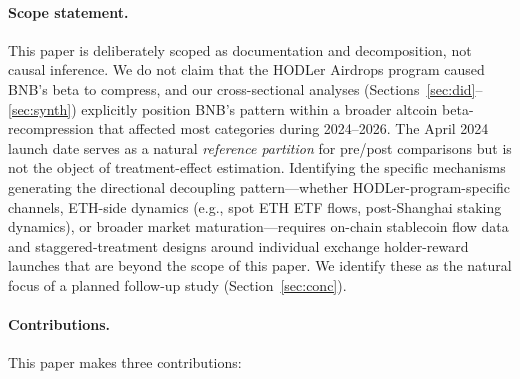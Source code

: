 \documentclass[11pt,a4paper]{article}
\begin{document}
\paragraph{Scope statement.} This paper is deliberately scoped as documentation and decomposition, not causal inference. We do not claim that the HODLer Airdrops program caused BNB's beta to compress, and our cross-sectional analyses (Sections~\ref{sec:did}--\ref{sec:synth}) explicitly position BNB's pattern within a broader altcoin beta-recompression that affected most categories during 2024--2026. The April 2024 launch date serves as a natural \emph{reference partition} for pre/post comparisons but is not the object of treatment-effect estimation. Identifying the specific mechanisms generating the directional decoupling pattern---whether HODLer-program-specific channels, ETH-side dynamics (e.g., spot ETH ETF flows, post-Shanghai staking dynamics), or broader market maturation---requires on-chain stablecoin flow data and staggered-treatment designs around individual exchange holder-reward launches that are beyond the scope of this paper. We identify these as the natural focus of a planned follow-up study (Section~\ref{sec:conc}).

\paragraph{Contributions.} This paper makes three contributions:
\end{document}
